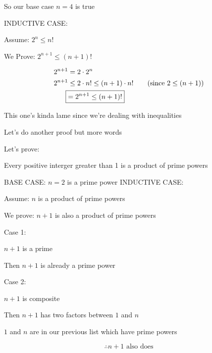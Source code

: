 \documentclass[../../Main.tex]{subfiles}
\begin{document}
\begin{example}
\begin{enumerate}
{\begin{poof}
                So our base case $n = 4$ is true

                INDUCTIVE CASE:

                Assume: $2^n \leq n!$

                We Prove: $2^{n + 1} \leq (n + 1)!$

                \begin{align*}
                    2^{n + 1} &= 2 \cdot 2^n \\
                    2^{n + 1} &\leq 2 \cdot n! \leq (n + 1) \cdot n! \tag{since $2 \leq (n + 1)$} \\
                    \Aboxed{&= 2^{n + 1} \leq (n + 1)!}
                \end{align*}

                \begin{note}
                    This one's kinda lame since we're dealing with inequalities
                \end{note}

            \end{poof}
        }
    \end{enumerate}
\end{example}

Let's do another proof but more words

Let's prove:

\begin{center}
    Every positive interger greater than 1 is a product of prime powers
\end{center}

\begin{poof}
    BASE CASE: $n = 2$ is a prime power
    INDUCTIVE CASE:

    Assume: $n$ is a product of prime powers

    We prove: $n + 1$ is also a product of prime powers

    Case 1:

    $n + 1$ is a prime

    Then $n + 1$ is already a prime power

    Case 2: 

    $n + 1$ is composite

    Then $n + 1$ has two factors between $1$ and $n$

    $1$ and $n$ are in our previous list which have prime powers

    $$\therefore n + 1 \text{ also does}$$
\end{poof}
\end{document}
